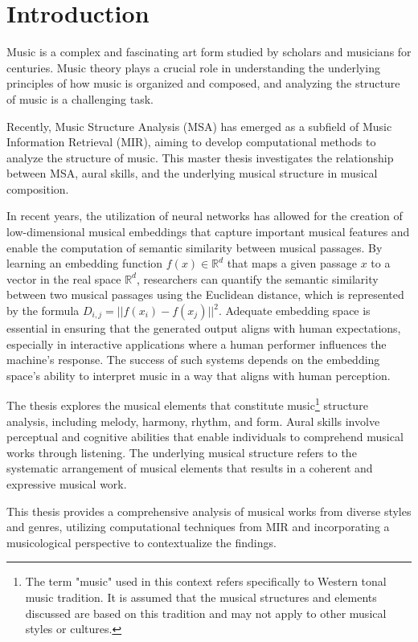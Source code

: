\normallinespacing

\chapter{Introduction}

Music is a complex and fascinating art form studied by scholars and musicians for centuries. Music theory plays a crucial role in understanding the underlying principles of how music is organized and composed, and analyzing the structure of music is a challenging task. 

Recently, Music Structure Analysis (MSA) has emerged as a subfield of Music Information Retrieval (MIR), aiming to develop computational methods to analyze the structure of music. This master thesis investigates the relationship between MSA, aural skills, and the underlying musical structure in musical composition. 

In recent years, the utilization of neural networks has allowed for the creation of low-dimensional musical embeddings that capture important musical features and enable the computation of semantic similarity between musical passages. By learning an embedding function $f(x) \in \mathbb{R}^d$ that maps a given passage $x$ to a vector in the real space $\mathbb{R}^d$, researchers can quantify the semantic similarity between two musical passages using the Euclidean distance, which is represented by the formula $D_{i,j} = ||f(x_i) - f(x_j)||^2$. Adequate embedding space is essential in ensuring that the generated output aligns with human expectations, especially in interactive applications where a human performer influences the machine's response. The success of such systems depends on the embedding space's ability to interpret music in a way that aligns with human perception.

The thesis explores the musical elements that constitute music\footnote{The term "music" used in this context refers specifically to Western tonal music tradition. It is assumed that the musical structures and elements discussed are based on this tradition and may not apply to other musical styles or cultures.} structure analysis, including melody, harmony, rhythm, and form. Aural skills involve perceptual and cognitive abilities that enable individuals to comprehend musical works through listening. The underlying musical structure refers to the systematic arrangement of musical elements that results in a coherent and expressive musical work. 

This thesis provides a comprehensive analysis of musical works from diverse styles and genres, utilizing computational techniques from MIR and incorporating a musicological perspective to contextualize the findings. 

